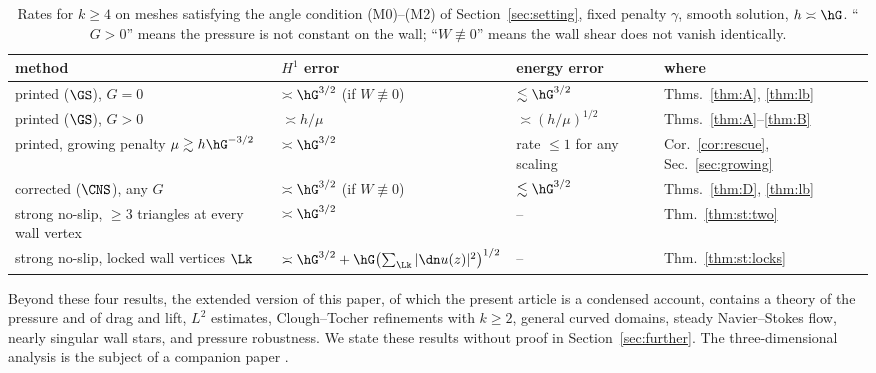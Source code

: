 \begin{table}[htb]
\centering\small
\caption{Rates for $k\ge4$ on meshes satisfying the angle condition (M0)--(M2) of Section~\ref{sec:setting}, fixed penalty $\gamma$, smooth solution, $h\asymp\hG$. ``$G>0$'' means the pressure is not constant on the wall; ``$W\not\equiv0$'' means the wall shear does not vanish identically.}\label{tab:summary}
\setlength{\tabcolsep}{3pt}
\begin{tabular}{>{\raggedright\arraybackslash}p{}>{\raggedright\arraybackslash}p{}>{\raggedright\arraybackslash}p{}>{\raggedright\arraybackslash}p{}}
\toprule
method & $H^1$ error & energy error & where\\
\midrule
printed ($\GS$), $G=0$ & $\asymp\hG^{3/2}$ (if $W\not\equiv0$) & $\lesssim\hG^{3/2}$ & Thms.~\ref{thm:A}, \ref{thm:lb}\\
printed ($\GS$), $G>0$ & $\asymp h/\mu$ & $\asymp(h/\mu)^{1/2}$ & Thms.~\ref{thm:A}--\ref{thm:B}\\
printed, growing penalty $\mu\gtrsim h\hG^{-3/2}$ & $\asymp\hG^{3/2}$ & rate $\le1$ for any scaling & Cor.~\ref{cor:rescue}, Sec.~\ref{sec:growing}\\
corrected ($\CNS$), any $G$ & $\asymp\hG^{3/2}$ (if $W\not\equiv0$) & $\lesssim\hG^{3/2}$ & Thms.~\ref{thm:D}, \ref{thm:lb}\\
strong no-slip, $\ge3$ triangles at every wall vertex & $\asymp\hG^{3/2}$ & -- & Thm.~\ref{thm:st:two}\\
strong no-slip, locked wall vertices $\Lk$ & $\asymp\hG^{3/2}+\hG\bigl(\sum_{\Lk}|\dn u(z)|^2\bigr)^{1/2}$ & -- & Thm.~\ref{thm:st:locks}\\
\bottomrule
\end{tabular}
\end{table}

Beyond these four results, the extended version \cite{PadhiExt} of this paper, of which the present article is a condensed account, contains a theory of the pressure and of drag and lift, $L^2$ estimates, Clough--Tocher refinements with $k\ge2$, general curved domains, steady Navier--Stokes flow, nearly singular wall stars, and pressure robustness. We state these results without proof in Section~\ref{sec:further}. The three-dimensional analysis is the subject of a companion paper \cite{PadhiThreeD}.

